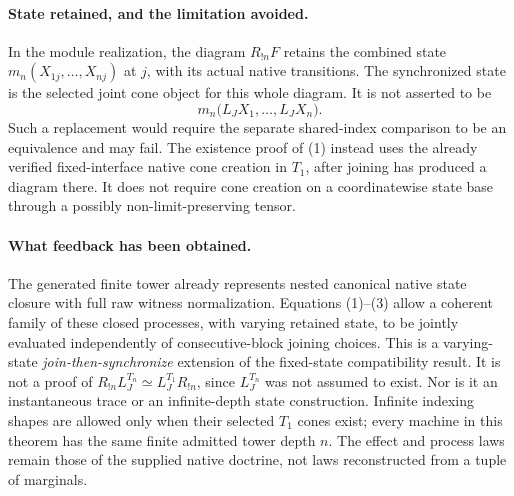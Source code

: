 \documentclass{article}
\begin{document}
\paragraph{State retained, and the limitation avoided.} In the module realization, the diagram $R_{!n}F$ retains the combined state $m_n(X_{1j},\ldots,X_{nj})$ at $j$, with its actual native transitions. The synchronized state is the selected joint cone object for this whole diagram. It is not asserted to be
\[
 m_n\bigl(L_JX_1,\ldots,L_JX_n\bigr).
\]
Such a replacement would require the separate shared-index comparison to be an equivalence and may fail. The existence proof of (1) instead uses the already verified fixed-interface native cone creation in $T_1$, after joining has produced a diagram there. It does not require cone creation on a coordinatewise state base through a possibly non-limit-preserving tensor.

\paragraph{What feedback has been obtained.} The generated finite tower already represents nested canonical native state closure with full raw witness normalization. Equations (1)--(3) allow a coherent family of these closed processes, with varying retained state, to be jointly evaluated independently of consecutive-block joining choices. This is a varying-state \emph{join-then-synchronize} extension of the fixed-state compatibility result. It is not a proof of $R_{!n}L_J^{T_n}\simeq L_J^{T_1}R_{!n}$, since $L_J^{T_n}$ was not assumed to exist. Nor is it an instantaneous trace or an infinite-depth state construction. Infinite indexing shapes are allowed only when their selected $T_1$ cones exist; every machine in this theorem has the same finite admitted tower depth $n$. The effect and process laws remain those of the supplied native doctrine, not laws reconstructed from a tuple of marginals.
\end{document}
